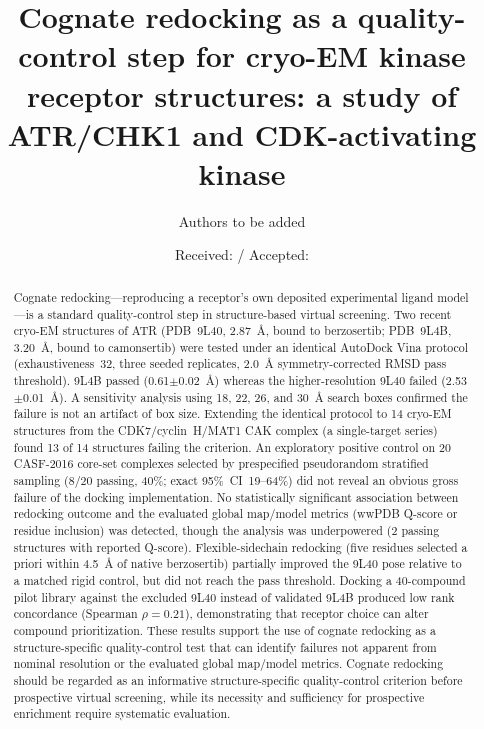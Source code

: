\documentclass[global,twocolumn]{svjour}
\begin{document}
\title{Cognate redocking as a quality-control step for cryo-EM kinase
       receptor structures: a study of ATR/CHK1 and
       CDK-activating kinase}

\author{Authors to be added}
\offprints{}

\date{Received: / Accepted:}
\maketitle

\begin{abstract}
Cognate redocking---reproducing a receptor's own deposited experimental
ligand model---is a standard quality-control step in structure-based virtual
screening. Two recent cryo-EM structures of ATR (PDB~9L40, 2.87~\AA{}, bound
to berzosertib; PDB~9L4B, 3.20~\AA{}, bound to camonsertib) were tested under
an identical AutoDock Vina protocol (exhaustiveness~32, three seeded
replicates, 2.0~\AA{} symmetry-corrected RMSD pass threshold). 9L4B passed
(0.61$\pm$0.02~\AA{}) whereas the higher-resolution 9L40 failed
(2.53$\pm$0.01~\AA{}). A sensitivity analysis using 18, 22, 26, and
30~\AA{} search boxes confirmed the failure is not an artifact of box size.
Extending the identical protocol to 14 cryo-EM structures from the
CDK7/cyclin~H/MAT1 CAK complex (a single-target series) found 13 of 14
structures failing the criterion. An exploratory positive control on 20
CASF-2016 core-set complexes selected by prespecified pseudorandom
stratified sampling (8/20 passing, 40\%; exact 95\%~CI~19--64\%) did not
reveal an obvious gross failure of the docking implementation. No
statistically significant association between redocking outcome and the
evaluated global map/model metrics (wwPDB Q-score or residue inclusion) was
detected, though the analysis was underpowered (2 passing structures with
reported Q-score). Flexible-sidechain redocking (five residues selected a
priori within 4.5~\AA{} of native berzosertib) partially improved the 9L40
pose relative to a matched rigid control, but did not reach the pass
threshold. Docking a 40-compound pilot library against the excluded 9L40
instead of validated 9L4B produced low rank concordance (Spearman
$\rho=0.21$), demonstrating that receptor choice can alter compound
prioritization. These results support the use of cognate redocking as a
structure-specific quality-control test that can identify failures not
apparent from nominal resolution or the evaluated global map/model metrics.
Cognate redocking should be regarded as an informative structure-specific
quality-control criterion before prospective virtual screening, while its
necessity and sufficiency for prospective enrichment require systematic
evaluation.
\end{abstract}
\end{document}
